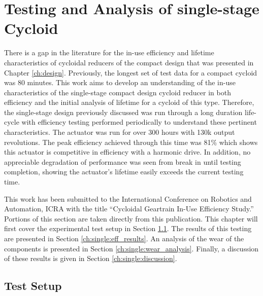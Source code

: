 
\chapter{Testing and Analysis of single-stage Cycloid}\label{ch:single}

There is a gap in the literature for the in-use efficiency and lifetime characteristics of cycloidal reducers of the compact design that was presented in Chapter \ref{ch:design}. Previously, the longest set of test data for a compact cycloid was 80 minutes. This work aims to develop an understanding of the in-use characteristics of the single-stage compact design cycloid reducer in both efficiency and the initial analysis of lifetime for a cycloid of this type. Therefore, the single-stage design previously discussed was run through a long duration life-cycle with efficiency testing performed periodically to understand these pertinent characteristics. The actuator was run for over 300 hours with 130k output revolutions. The peak efficiency achieved through this time was 81\% which shows this actuator is competitive in efficiency with a harmonic drive. In addition, no appreciable degradation of performance was seen from break in until testing completion, showing the actuator's lifetime easily exceeds the current testing time.  

This work has been submitted to the International Conference on Robotics and Automation, ICRA with the title ``Cycloidal Geartrain In-Use Efficiency Study.'' Portions of this section are taken directly from this publication. This chapter will first cover the experimental test setup in Section \ref{ch:single:test_setup}. The results of this testing are presented in Section \ref{ch:single:eff_results}. An analysis of the wear of the components is presented in Section \ref{ch:single:wear_analysis}. Finally, a discussion of these results is given in Section \ref{ch:single:discussion}.

\section{Test Setup} \label{ch:single:test_setup}

